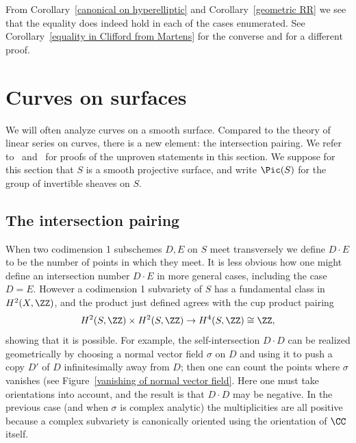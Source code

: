 From Corollary~\ref{canonical on hyperelliptic} and Corollary~\ref{geometric RR} we see that the equality does indeed hold
in each of the cases enumerated. See
Corollary~\ref{equality in Clifford from Martens} for the converse and \cite[IV.5.4]{Hartshorne1977}
for a different proof.

 \section{Curves on surfaces}\label{surface basics}
 
 We will often analyze curves  on a smooth surface. Compared to the theory of linear series on curves, there is a new element: the intersection pairing. We refer to~\cite[Chapter V]{Hartshorne1977}
%
 and~\cite[Chapter I]{Beauville} for 
proofs
of the unproven statements in this section.
 We suppose for this section that $S$ is a smooth projective surface,
 and write $\Pic(S)$ for the group of invertible sheaves on $S$.

\subsection*{The intersection pairing}

When two codimension 1 subschemes $D,E$ on $S$ 
meet transversely we define $D\cdot E$ to be the number of points in which they meet.  
It is less obvious how one might define an intersection number $D\cdot E$ in more general cases,
including the case $D=E$. However 
a codimension 1 subvariety of $S$ has a 
%
fundamental class in $H^{2}(X,\ZZ)$, and the product just defined
agrees with the cup product pairing
%
$$
H^{2}(S,\ZZ) \times H^{2}(S,\ZZ) \to H^4(S,\ZZ)\cong \ZZ,
$$
showing that it is possible. For example, the self-intersection $D\cdot D$ can be realized geometrically
 by choosing a normal vector field $\sigma$ on $D$ and using it to push a copy $D'$ of $D$ infinitesimally away from $D$; then
 one can count the points where $\sigma$ vanishes (see Figure~\ref{vanishing of normal vector field}. Here one must take orientations into account,
 and the result is that $D\cdot D$ may be negative. In the previous case (and when $\sigma$ is complex analytic)
 the multiplicities are all positive because a complex subvariety is canonically oriented using the orientation of $\CC$
 itself.

